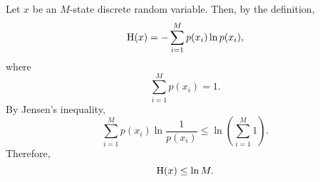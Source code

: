 \subsection{}
Let $x$ be an $M$-state discrete random variable.
Then, by the definition,
%
\begin{equation}
{\rm H} (x) = - \sum_{i = 1}^{M} p(x_i) \ln p(x_i),
\end{equation}
%
where
%
\begin{equation}
\sum_{i = 1}^{M} p(x_i) = 1.
\end{equation}
%
By Jensen's inequality,
%
\begin{equation}
\sum_{i = 1}^{M} p(x_i) \ln \frac{1}{p(x_i)} \leq \ln \left( \sum_{i = 1}^{M} 1 \right).
\end{equation}
Therefore,
%
\begin{equation}
{\rm H} (x) \leq \ln M.
\end{equation}
%



